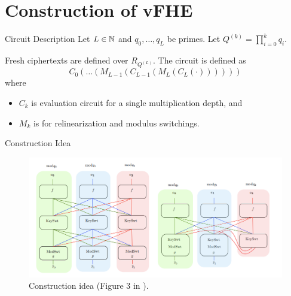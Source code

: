 \section{Construction of vFHE}
\begin{frame}{Circuit Description}
	Let $L \in \mathbb{N}$ and $q_0, \dots, q_L$ be primes. Let $Q^{(k)} = \prod_{i = 0}^k q_i$.
	
	Fresh ciphertexts are defined over $R_{Q^{(L)}}$. The circuit is defined as
	\begin{equation*}
		C_0(\dots(M_{L-1}(C_{L-1}(M_L(C_L(\cdot))))))
	\end{equation*}
	where 
	\begin{itemize}
		\item $C_k$ is evaluation circuit for a single multiplication depth, and
		\item $M_k$ is for relinearization and modulus switchings.
	\end{itemize}
\end{frame}

\begin{frame}{Construction Idea}
	\begin{figure}
		\centering
		\includegraphics[width=1.1\linewidth]{proofidea}
		\caption{Construction idea (Figure 3 in \cite{CIC:ABPS24}).}
		\label{fig:proofidea}
	\end{figure}
	
\end{frame}